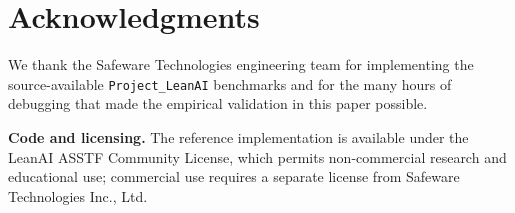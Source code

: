 \documentclass[11pt,a4paper]{article}
\theoremstyle{definition}
\begin{document}
\section*{Acknowledgments}

We thank the Safeware Technologies engineering team for implementing the source-available \texttt{Project\_LeanAI} benchmarks and for the many hours of debugging that made the empirical validation in this paper possible.

\textbf{Code and licensing.} The reference implementation is available under the LeanAI ASSTF Community License, which permits non-commercial research and educational use; commercial use requires a separate license from Safeware Technologies Inc., Ltd.

\end{document}
